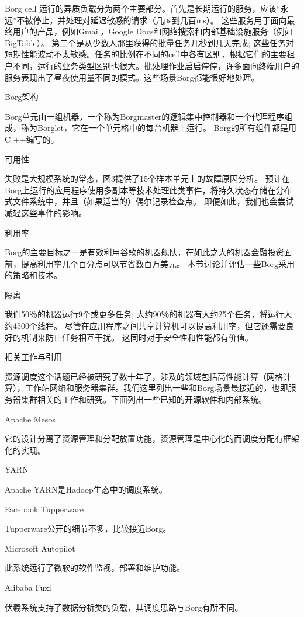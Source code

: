 Borg cell 运行的异质负载分为两个主要部分。首先是长期运行的服务，应该“永远”不被停止，并处理对延迟敏感的请求（几μs到几百ms）。 这些服务用于面向最终用户的产品，例如Gmail，Google Docs和网络搜索和内部基础设施服务（例如BigTable）。 第二个是从少数人那里获得的批量任务几秒到几天完成; 这些任务对短期性能波动不太敏感。任务的比例在不同的cell中各有区别，根据它们的主要租户不同，运行的业务类型区别也很大。批处理作业启启停停，许多面向终端用户的服务表现出了昼夜使用量不同的模式。这些场景Borg都能很好地处理。

Borg架构

Borg单元由一组机器，一个称为Borgmaster的逻辑集中控制器和一个代理程序组成，称为Borglet，它在一个单元格中的每台机器上运行。 Borg的所有组件都是用C ++编写的。

可用性

失败是大规模系统的常态，图3提供了15个样本单元上的故障原因分析。 预计在Borg上运行的应用程序使用多副本等技术处理此类事件，将持久状态存储在分布式文件系统中，并且（如果适当的）偶尔记录检查点。 即便如此，我们也会尝试减轻这些事件的影响。

利用率

Borg的主要目标之一是有效利用谷歌的机器舰队，在如此之大的机器金融投资面前，提高利用率几个百分点可以节省数百万美元。 本节讨论并评估一些Borg采用的策略和技术。

隔离

我们50％的机器运行9个或更多任务; 大约90％的机器有大约25个任务，将运行大约4500个线程。 尽管在应用程序之间共享计算机可以提高利用率，但它还需要良好的机制来防止任务相互干扰。 这同时对于安全性和性能都有价值。

相关工作与引用

资源调度这个话题已经被研究了数十年了，涉及的领域包括高性能计算（网格计算），工作站网络和服务器集群。我们这里列出一些和Borg场景最接近的，也即服务器集群相关的工作和研究。下面列出一些已知的开源软件和内部系统。

Apache Mesos

它的设计分离了资源管理和分配放置功能，资源管理是中心化的而调度分配有框架化的实现。

YARN

Apache YARN是Hadoop生态中的调度系统。

Facebook Tupperware

Tupperware公开的细节不多，比较接近Borg。

Microsoft Autopilot

此系统运行了微软的软件监视，部署和维护功能。

Alibaba Fuxi

伏羲系统支持了数据分析类的负载，其调度思路与Borg有所不同。 

